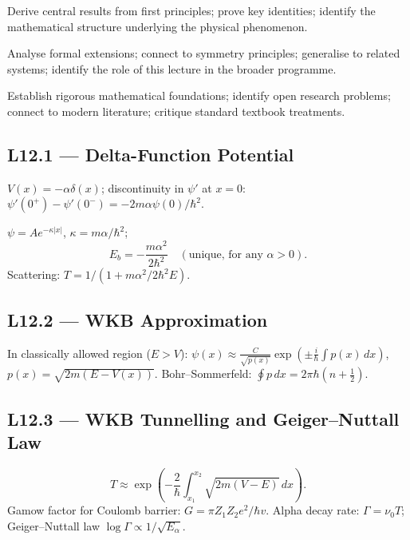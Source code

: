 \quad
Derive central results from first principles; prove key identities; identify
the mathematical structure underlying the physical phenomenon.

\quad
Analyse formal extensions; connect to symmetry principles; generalise to
related systems; identify the role of this lecture in the broader programme.

\quad
Establish rigorous mathematical foundations; identify open research problems;
connect to modern literature; critique standard textbook treatments.


\subsection*{L12.1 — Delta-Function Potential}
$V(x) = -\alpha\delta(x)$; discontinuity in $\psi'$ at $x=0$:
$\psi'(0^+)-\psi'(0^-) = -2m\alpha\psi(0)/\hbar^2$.

\begin{tcolorbox}[lecturebox, title={Delta-Function Bound State}]
$\psi = Ae^{-\kappa|x|}$, $\kappa = m\alpha/\hbar^2$;
\begin{equation}
  E_b = -\frac{m\alpha^2}{2\hbar^2} \quad (\text{unique, for any } \alpha>0).
  \label{eq:L12.1}
\end{equation}
Scattering: $T = 1/(1+m\alpha^2/2\hbar^2 E)$.
\end{tcolorbox}

\subsection*{L12.2 — WKB Approximation}
In classically allowed region ($E>V$):
$\psi(x) \approx \frac{C}{\sqrt{p(x)}}\exp\!\left(\pm\frac{i}{\hbar}\int p(x)\,dx\right)$,
$p(x)=\sqrt{2m(E-V(x))}$.
Bohr–Sommerfeld: $\oint p\,dx = 2\pi\hbar(n+\tfrac{1}{2})$.

\subsection*{L12.3 — WKB Tunnelling and Geiger–Nuttall Law}
\begin{tcolorbox}[lecturebox, title={WKB Tunnelling Rate}]
\begin{equation}
  T \approx \exp\!\left(-\frac{2}{\hbar}\int_{x_1}^{x_2}\sqrt{2m(V-E)}\,dx\right).
  \label{eq:L12.2}
\end{equation}
Gamow factor for Coulomb barrier: $G=\pi Z_1Z_2e^2/\hbar v$.
Alpha decay rate: $\Gamma = \nu_0 T$; Geiger–Nuttall law $\log\Gamma \propto 1/\sqrt{E_\alpha}$.
\end{tcolorbox}


